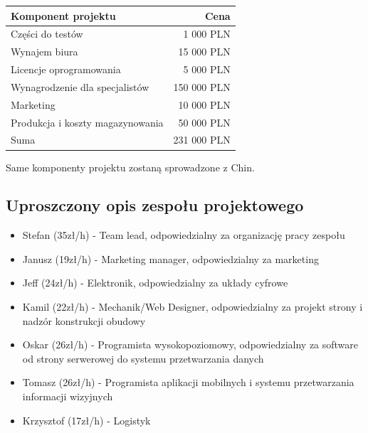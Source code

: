 \documentclass[12pt]{article}
\begin{document}
\begin{table}[!h]
	\centering
	\begin{tabular}{l|r}
		Komponent projektu & Cena \\\hline
		
		Części do testów & 1 000 PLN \\
		
		Wynajem biura & 15 000 PLN \\
		
		Licencje oprogramowania & 5 000 PLN \\
		
		Wynagrodzenie dla specjalistów & 150 000 PLN \\
		
		Marketing & 10 000 PLN \\
		
		Produkcja i koszty magazynowania & 50 000 PLN \\
		
		\hline
		Suma & 231 000 PLN
		
	\end{tabular}
	
\end{table}

Same komponenty projektu zostaną sprowadzone z Chin.



\subsection{Uproszczony opis zespołu projektowego}

\begin{itemize}
	
\item Stefan (35zł/h) - Team lead, odpowiedzialny za organizację pracy zespołu

\item Janusz (19zł/h) - Marketing manager, odpowiedzialny za marketing 

\item Jeff (24zł/h) - Elektronik, odpowiedzialny za układy cyfrowe

\item Kamil (22zł/h) - Mechanik/Web Designer, odpowiedzialny za projekt strony i nadzór konstrukcji obudowy

\item Oskar (26zł/h) - Programista wysokopoziomowy, odpowiedzialny za software od strony serwerowej do systemu przetwarzania danych

\item Tomasz (26zł/h) - Programista aplikacji mobilnych i systemu przetwarzania informacji wizyjnych

\item Krzysztof (17zł/h) - Logistyk 

\end{itemize}
\end{document}
